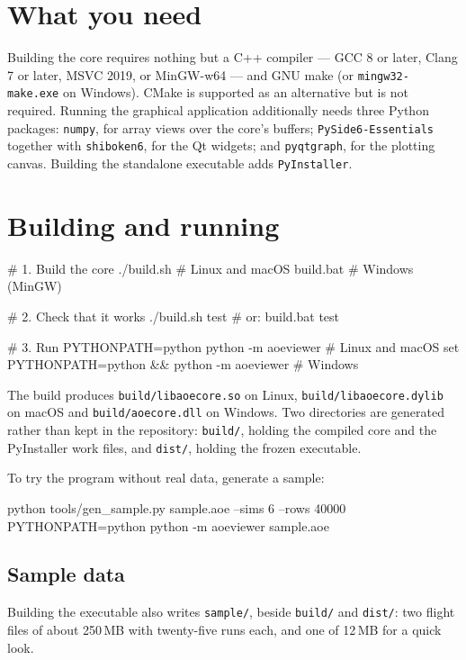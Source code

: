 \documentclass[11pt,a4paper,oneside]{report}
\newcommand{\code}[1]{\texttt{#1}}
\begin{document}
\section{What you need}

Building the core requires nothing but a C++ compiler --- GCC 8 or later, Clang
7 or later, MSVC 2019, or MinGW-w64 --- and GNU make (or
\code{mingw32-make.exe} on Windows). CMake is supported as an alternative but
is not required. Running the graphical application additionally needs three
Python packages: \code{numpy}, for array views over the core's buffers;
\code{PySide6-Essentials} together with \code{shiboken6}, for the Qt widgets;
and \code{pyqtgraph}, for the plotting canvas. Building the standalone
executable adds \code{PyInstaller}.

\section{Building and running}

\begin{aoecode}
# 1. Build the core
./build.sh                  # Linux and macOS
build.bat                   # Windows (MinGW)

# 2. Check that it works
./build.sh test             # or: build.bat test

# 3. Run
PYTHONPATH=python python -m aoeviewer                # Linux and macOS
set PYTHONPATH=python && python -m aoeviewer         # Windows
\end{aoecode}

The build produces \code{build/libaoecore.so} on Linux,
\code{build/libaoecore.dylib} on macOS and \code{build/aoecore.dll} on
Windows. Two directories are generated rather than kept in the repository:
\code{build/}, holding the compiled core and the PyInstaller work files, and
\code{dist/}, holding the frozen executable.

To try the program without real data, generate a sample:

\begin{aoecode}
python tools/gen_sample.py sample.aoe --sims 6 --rows 40000
PYTHONPATH=python python -m aoeviewer sample.aoe
\end{aoecode}

\subsection{Sample data}
\label{sec:samples}

Building the executable also writes \code{sample/}, beside \code{build/} and
\code{dist/}: two flight files of about 250\,MB with twenty-five runs each, and
one of 12\,MB for a quick look.
\end{document}
